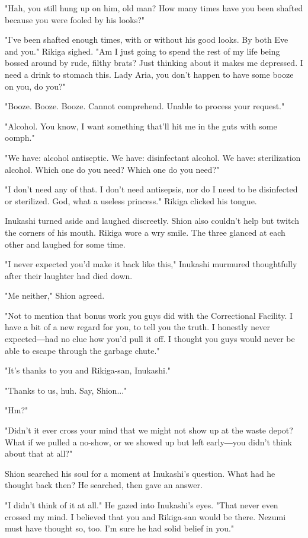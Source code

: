 "Hah, you still hung up on him, old man? How many times have you been
shafted because you were fooled by his looks?"

"I've been shafted enough times, with or without his good looks. By both
Eve and you." Rikiga sighed. "Am I just going to spend the rest of my
life being bossed around by rude, filthy brats? Just thinking about it
makes me depressed. I need a drink to stomach this. Lady Aria, you don't
happen to have some booze on you, do you?"

"Booze. Booze. Booze. Cannot comprehend. Unable to process your
request."

"Alcohol. You know, I want something that'll hit me in the guts with
some oomph."

"We have: alcohol antiseptic. We have: disinfectant alcohol. We have:
sterilization alcohol. Which one do you need? Which one do you need?"

"I don't need any of that. I don't need antisepsis, nor do I need to be
disinfected or sterilized. God, what a useless princess." Rikiga clicked
his tongue.

Inukashi turned aside and laughed discreetly. Shion also couldn't help
but twitch the corners of his mouth. Rikiga wore a wry smile. The three
glanced at each other and laughed for some time.

"I never expected you'd make it back like this," Inukashi murmured
thoughtfully after their laughter had died down.

"Me neither," Shion agreed.

"Not to mention that bonus work you guys did with the Correctional
Facility. I have a bit of a new regard for you, to tell you the truth. I
honestly never expected―had no clue how you'd pull it off. I thought you
guys would never be able to escape through the garbage chute."

"It's thanks to you and Rikiga-san, Inukashi."

"Thanks to us, huh. Say, Shion..."

"Hm?"

"Didn't it ever cross your mind that we might not show up at the waste
depot? What if we pulled a no-show, or we showed up but left early―you
didn't think about that at all?"

Shion searched his soul for a moment at Inukashi's question. What had he
thought back then? He searched, then gave an answer.

"I didn't think of it at all." He gazed into Inukashi's eyes. "That
never even crossed my mind. I believed that you and Rikiga-san would be
there. Nezumi must have thought so, too. I'm sure he had solid belief in
you."

